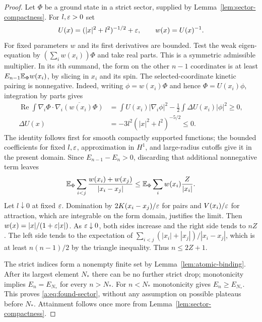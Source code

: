 \begin{proof}
Let $\Phi$ be a ground state in a strict sector, supplied by
Lemma~\ref{lem:sector-compactness}.  For $l,\varepsilon>0$ set
\[
 U(x)=(|x|^2+l^2)^{-1/2}+\varepsilon,\qquad w(x)=U(x)^{-1}.
\]
For fixed parameters $w$ and its first derivatives are bounded.
Test the weak eigen-equation by $(\sum_iw(x_i))\Phi$ and take real
parts.  This is a symmetric admissible multiplier.  In its $i$th
summand, the form on the other $n-1$ coordinates is at least
$E_{n-1}\mathbb E_\Phi w(x_i)$, by slicing in $x_i$ and its spin.  The
selected-coordinate kinetic pairing is nonnegative.  Indeed, writing
$\phi=w(x_i)\Phi$ and hence $\Phi=U(x_i)\phi$, integration by parts
gives
\begin{align*}
 \operatorname{Re}\int\nabla_i\Phi\cdot
                    \overline{\nabla_i(w(x_i)\Phi)}
 &=\int U(x_i)|\nabla_i\phi|^2
       -\frac12\int\Delta U(x_i)|\phi|^2\geq0,\\
 \Delta U(x)&=-3l^2(|x|^2+l^2)^{-5/2}\leq0.
\end{align*}
The identity follows first for smooth compactly supported functions;
the bounded coefficients for fixed $l,\varepsilon$, approximation in $H^1$,
and large-radius cutoffs give it in the present domain.
Since $E_{n-1}-E_n>0$, discarding that additional nonnegative term
leaves
\begin{equation}\label{a:eq:found-weighted}
 \mathbb E_\Phi\sum_{i<j}\frac{w(x_i)+w(x_j)}{|x_i-x_j|}
 \leq \mathbb E_\Phi\sum_i w(x_i)\frac Z{|x_i|}.
\end{equation}
Let $l\downarrow0$ at fixed $\varepsilon$.  Domination by
$2K(x_i-x_j)/\varepsilon$ for pairs and $V(x_i)/\varepsilon$ for attraction,
which are integrable on the form domain, justifies the limit.
Then $w(x)=|x|/(1+\varepsilon|x|)$.  As $\varepsilon\downarrow0$, both sides
increase and the right side tends to $nZ$.  The left side tends to
the expectation of
$\sum_{i<j}(|x_i|+|x_j|)/|x_i-x_j|$, which is at least
$n(n-1)/2$ by the triangle inequality.  Thus $n\leq2Z+1$.

The strict indices form a nonempty finite set by
Lemma~\ref{lem:atomic-binding}.  After its largest element $N_*$
there can be no further strict drop; monotonicity implies
$E_n=E_{N_*}$ for every $n>N_*$.  For $n<N_*$ monotonicity gives
$E_n\geq E_{N_*}$.  This proves \eqref{a:eq:found-sector}, without
any assumption on possible plateaus before $N_*$.  Attainment
follows once more from Lemma~\ref{lem:sector-compactness}.
\end{proof}

